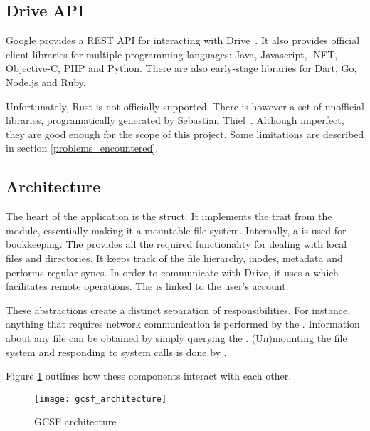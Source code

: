 \subsection{Drive API}

Google provides a REST API for interacting with Drive~\cite{google_drive_rest_api_overview}. It also provides official client libraries for multiple programming languages: Java, Javascript, .NET, Objective-C, PHP and Python. There are also early-stage libraries for Dart, Go, Node.js and Ruby.

Unfortunately, Rust is not officially supported. There is however a set of unofficial libraries, programatically generated by Sebastian Thiel~\cite{google_apis_rs,sebastian_thiel}. Although imperfect, they are good enough for the scope of this project. Some limitations are described in section \ref{problems_encountered}.

\subsection{Architecture}

The heart of the application is the  struct. It implements the  trait from the  module, essentially making it a mountable file system. Internally, a  is used for bookkeeping. The  provides all the required functionality for dealing with local files and directories. It keeps track of the file hierarchy, inodes, metadata and performs regular syncs. In order to communicate with Drive, it uses a  which facilitates remote operations. The  is linked to the user's account.

These abstractions create a distinct separation of responsibilities. For instance, anything that requires network communication is performed by the . Information about any file can be obtained by simply querying the . (Un)mounting the file system and responding to system calls is done by .

Figure \ref{fig:gcsf_architecture} outlines how these components interact with each other.

\begin{figure}[bpt]
\caption{GCSF architecture}
\label{fig:gcsf_architecture}
\centering
\texttt{[image: gcsf\_architecture]}
\end{figure}

